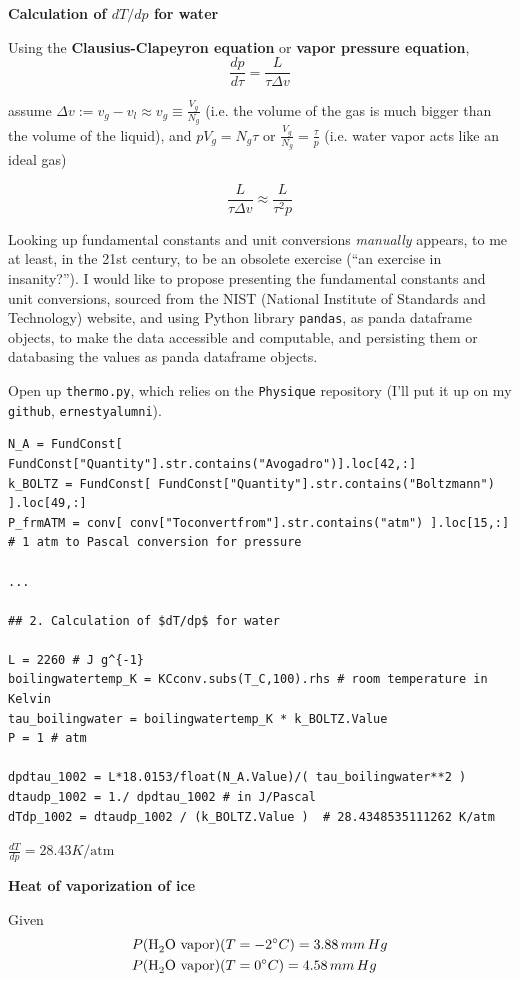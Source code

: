  \textbf{Calculation of $dT/dp$ for water}

Using the \textbf{Clausius-Clapeyron equation} or \textbf{vapor pressure equation}, 
\[
\frac{dp}{d\tau} = \frac{L}{\tau \Delta v}
\]

assume $\Delta v := v_g - v_l \approx v_g \equiv \frac{V_g}{N_g}$ (i.e. the volume of the gas is much bigger than the volume of the liquid), and $pV_g = N_g \tau$ or $\frac{V_g}{N_g} = \frac{\tau}{p}$ (i.e. water vapor acts like an ideal gas)

\[
\frac{L}{ \tau \Delta v} \approx \frac{L}{ \tau^2 p}
\] 

Looking up fundamental constants and unit conversions \emph{manually} appears, to me at least, in the 21st century, to be an obsolete exercise (``an exercise in insanity?'').  I would like to propose presenting the fundamental constants and unit conversions, sourced from the NIST (National Institute of Standards and Technology) website, and using Python library \verb|pandas|, as panda dataframe objects, to make the data accessible and computable, and persisting them or databasing the values as panda dataframe objects.  

Open up \verb|thermo.py|, which relies on the \verb|Physique| repository (I'll put it up on my \verb|github|, \verb|ernestyalumni|).  

\begin{lstlisting}
N_A = FundConst[ FundConst["Quantity"].str.contains("Avogadro")].loc[42,:]
k_BOLTZ = FundConst[ FundConst["Quantity"].str.contains("Boltzmann") ].loc[49,:]
P_frmATM = conv[ conv["Toconvertfrom"].str.contains("atm") ].loc[15,:] # 1 atm to Pascal conversion for pressure

...

## 2. Calculation of $dT/dp$ for water

L = 2260 # J g^{-1}
boilingwatertemp_K = KCconv.subs(T_C,100).rhs # room temperature in Kelvin
tau_boilingwater = boilingwatertemp_K * k_BOLTZ.Value
P = 1 # atm

dpdtau_1002 = L*18.0153/float(N_A.Value)/( tau_boilingwater**2 )
dtaudp_1002 = 1./ dpdtau_1002 # in J/Pascal
dTdp_1002 = dtaudp_1002 / (k_BOLTZ.Value )  # 28.4348535111262 K/atm
\end{lstlisting}

$\boxed{ \frac{dT}{dp} = 28.43 K/\text{atm} }$


 \textbf{Heat of vaporization of ice}

Given
\[
\begin{aligned}
  & P(\ce{H2O} \text{ vapor} )(T = -2^{\circ}C) = 3.88 \, mm \, Hg \\ 
  & P(\ce{H2O} \text{ vapor})(T = 0^{\circ}C) = 4.58 \, mm \, Hg 
\end{aligned}
\]

